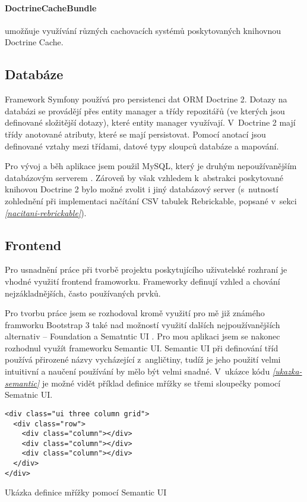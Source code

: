     \paragraph{DoctrineCacheBundle} 
    umožňuje využívání různých cachovacích systémů poskytovaných knihovnou Doctrine Cache. \autocite{doctrinecache}

\subsection{Databáze}
Framework Symfony používá pro persistenci dat \gls{ORM} Doctrine 2. Dotazy na databázi se provádějí přes entity manager a třídy
repozitářů (ve kterých jsou definované složitější dotazy), které entity manager využívají. V~Doctrine 2 mají třídy anotované atributy, které se mají persistovat. Pomocí anotací jsou definované vztahy mezi třídami, datové typy sloupců databáze a mapování.

Pro vývoj a běh aplikace jsem použil MySQL, který je druhým nepoužívanějším databázovým serverem \autocite{database-servers}. Zároveň by však vzhledem k~abstrakci poskytované knihovou Doctrine 2 bylo možné zvolit i jiný databázový server (s~nutností zohlednění při implementaci načítání CSV tabulek Rebrickable, popsané v~sekci \emph{\ref{nacitani-rebrickable}}).

\subsection{Frontend}
Pro usnadnění práce při tvorbě projektu poskytujícího uživatelské rozhraní je vhodné využití frontend framoworku. Frameworky definují vzhled a chování nejzákladnějších, často používaných prvků. 

Pro tvorbu práce jsem se rozhodoval kromě využití pro mě již známého framworku Bootstrap 3 také nad možností využití dalších nejpoužívanějších alternativ – Foundation a Sematntic UI \autocite{web:frameworks}. Pro mou aplikaci jsem se nakonec rozhodnul využít frameworku Semantic UI. Semantic UI při definování tříd používá přirozené názvy vycházející z~angličtiny, tudíž je jeho použití velmi intuitivní a naučení používání by mělo být velmi snadné. V~ukázce kódu \emph{\ref{ukazka-semantic}} je možné vidět příklad definice mřížky se třemi sloupečky pomocí Sematnic UI.

\begin{listing}[htbp]
  \begin{verbatim}
<div class="ui three column grid">
  <div class="row">
    <div class="column"></div>
    <div class="column"></div>
    <div class="column"></div>
  </div>
</div>
    \end{verbatim}
  \caption{Ukázka definice mřížky pomocí Semantic UI\label{ukazka-semantic}}
\end{listing}